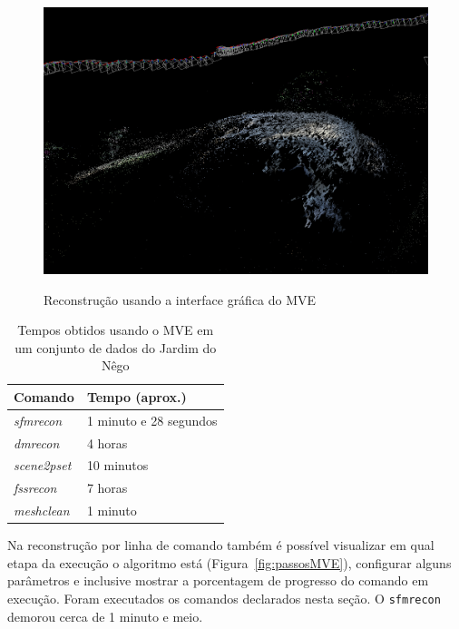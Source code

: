 \begin{figure}[!h]
	\centering
	\caption{Reconstrução usando a interface gráfica do MVE}
	\includegraphics[width=\linewidth]{figs/umvedense.png}
	\label{fig:UMVEdense}
\end{figure} 

\newpage

\begin{table}[!htpb]
\centering
\caption{Tempos obtidos usando o MVE em um conjunto de dados do Jardim do Nêgo}
\label{tab:mveSapo}
\begin{tabular}{|l|l|}
\hline
Comando            & Tempo (aprox.)    \\ \hline
\emph{sfmrecon}  & 1 minuto e 28 segundos     \\ \hline
\emph{dmrecon}   & 4 horas \\ \hline
\emph{scene2pset} & 10 minutos    \\ \hline
\emph{fssrecon}  & 7 horas \\ \hline
\emph{meshclean} & 1 minuto     \\ \hline
\end{tabular}
\end{table}

Na reconstrução por linha de comando também é possível visualizar em qual etapa
da execução o algoritmo está (Figura~\ref{fig:passosMVE}), configurar alguns
parâmetros e inclusive mostrar a porcentagem de progresso do comando em
execução. Foram executados os comandos declarados nesta seção.  O
\texttt{sfmrecon} demorou cerca de 1 minuto e meio. %


